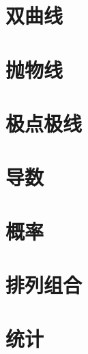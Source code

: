 \documentclass[lang=cn,10pt,color=cyan,titlestyle=hang,device=normal]{elegantbook}
\begin{document}
\chapter{双曲线}




\chapter{抛物线}


\chapter{极点极线}


\chapter{导数}
















\chapter{概率}



\chapter{排列组合}




\chapter{统计}

\end{document}
